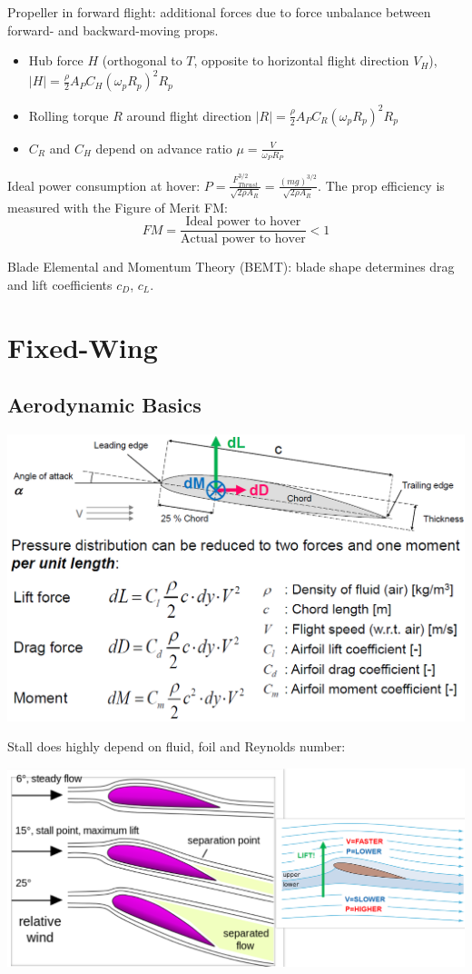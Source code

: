 \documentclass[a4paper, 8pt]{extarticle}
\begin{document}
\begin{multicols*}{3}
Propeller in forward flight: additional forces due to force unbalance between forward- and backward-moving props.
\begin{itemize}
\item Hub force $H$ (orthogonal to $T$, opposite to horizontal flight direction $V_H$), $|H| = \frac{\rho}{2} A_P C_H(\omega_p R_p)^2R_p$
\item Rolling torque $R$ around flight direction $|R| = \frac{\rho}{2} A_P C_R(\omega_p R_p)^2R_p$
\item $C_R$ and $C_H$ depend on advance ratio $\mu = \frac{V}{\omega_P R_P}$
\end{itemize}

Ideal power consumption at hover: $P = \frac{F_{Thrust}^{3/2}}{\sqrt{2\rho A_R}} = \frac{(mg)^{3/2}}{\sqrt{2\rho A_R}}$. The prop efficiency is measured with the Figure of Merit FM:
$$FM = \frac{\text{Ideal power to hover}}{\text{Actual power to hover}} < 1$$

Blade Elemental and Momentum Theory (BEMT): blade shape determines drag and lift coefficients $c_D$, $c_L$.




\section{Fixed-Wing}
\subsection{Aerodynamic Basics}
\begin{center}
    \includegraphics[width=0.9\linewidth, frame]{images/UAV_Airfoil.PNG}
\end{center}
Stall does highly depend on fluid, foil and Reynolds number:
\begin{center}
    \includegraphics[width=1\linewidth]{images/FW_Stall.png}
\end{center}



\end{multicols*}
\end{document}
